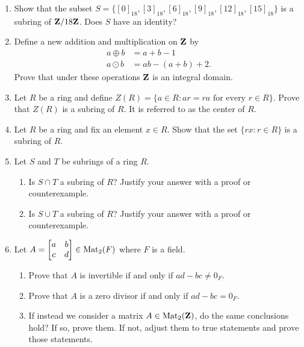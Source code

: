 \documentclass[11pt]{article}
\begin{document}
\begin{enumerate}
\item Show that the subset $S = \{[0]_{18}, [3]_{18}, [6]_{18}, [9]_{18}, [12]_{18}, [15]_{18}\}$ is a subring of $\mathbf{Z}/18\mathbf{Z}$.  Does $S$ have an identity?

\item Define a new addition and multiplication on $\mathbf{Z}$ by 
\begin{align*}
a\oplus b&= a+b-1 \\
a\odot b&= ab - (a+b)+2.
\end{align*}
Prove that under these operations $\mathbf{Z}$ is an integral domain. 

\item Let $R$ be a ring and define $\textrm{$Z(R) = \{a \in R: ar = ra$ for every $r \in R$}\}$. Prove that $Z(R)$ is a subring of $R$. It is referred to as the center of $R$. 

\item Let $R$ be a ring and fix an element $x \in R$.  Show that the set $\{rx: r \in R\}$ is a subring of $R$. 

\item Let $S$ and $T$ be subrings of a ring $R$. 
\begin{enumerate}
\item Is $S\cap T$ a subring of $R$?  Justify your answer with a proof or counterexample.
\item Is $S\cup T$ a subring of $R$?  Justify your answer with a proof or counterexample.
\end{enumerate}

\item Let $A = \begin{bmatrix} a & b \\ c & d \end{bmatrix} \in \operatorname{Mat}_2(F)$ where $F$ is a field. 
\begin{enumerate}
\item Prove that $A$ is invertible if and only if $ad-bc \neq 0_{F}$. 
\item Prove that $A$ is a zero divisor if and only if $ad-bc = 0_{F}$. 
\item If instead we consider a matrix $A \in \operatorname{Mat}_2(\mathbf{Z})$, do the same conclusions hold?  If so, prove them.  If not, adjust them to true statements and prove those statements.
\end{enumerate}





\end{enumerate}
\end{document}
